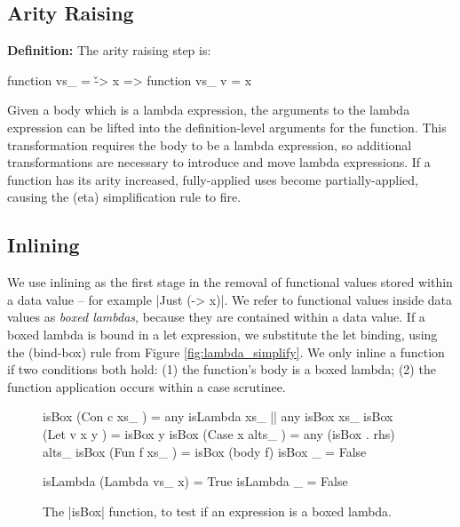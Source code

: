 \documentclass[preprint]{sigplanconf}
\newenvironment{definition}
    {\textbf{Definition:}}
    {\noexample}
\begin{document}
\subsection{Arity Raising}

\begin{definition}
The arity raising step is:

\ignore\begin{code}
function vs_ = \v -> x
    => function vs_ v = x
\end{code}
\end{definition}

Given a body which is a lambda expression, the arguments to the lambda expression can be lifted into the definition-level arguments for the function. This transformation requires the body to be a lambda expression, so additional transformations are necessary to introduce and move lambda expressions. If a function has its arity increased, fully-applied uses become partially-applied, causing the (eta) simplification rule to fire.


\subsection{Inlining}
\label{sec:inlining}

We use inlining as the first stage in the removal of functional values stored within a data value -- for example |Just (\x -> x)|. We refer to functional values inside data values as \textit{boxed lambdas}, because they are contained within a data value. If a boxed lambda is bound in a let expression, we substitute the let binding, using the (bind-box) rule from Figure \ref{fig:lambda_simplify}. We only inline a function if two conditions both hold: (1) the function's body is a boxed lambda; (2) the function application occurs within a case scrutinee.

\begin{figure}
\begin{code}
isBox (Con c xs_     )  =  any isLambda xs_ ||  any isBox xs_
isBox (Let v x y     )  =  isBox y
isBox (Case x alts_  )  =  any (isBox . rhs) alts_
isBox (Fun f xs_     )  =  isBox (body f)
isBox _                 =  False

isLambda (Lambda vs_ x)  = True
isLambda _               = False
\end{code}
\caption{The |isBox| function, to test if an expression is a boxed lambda.}
\label{fig:boxed_lambda}
\end{figure}
\end{document}
